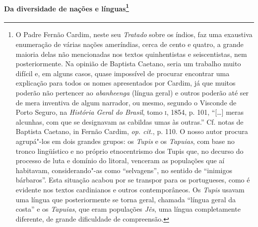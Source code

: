 \paragraph[Da diversidade de nações e línguas]{Da diversidade de nações e línguas\protect\footnote{ O
Padre Fernão Cardim, neste seu \textit{Tratado} sobre os índios, faz
uma exaustiva enumeração de várias nações ameríndias, cerca de cento e
quatro, a grande maioria delas não mencionadas nos textos quinhentistas
e seiscentistas, nem posteriormente. Na opinião de Baptista Caetano,
seria um trabalho muito difícil e, em alguns casos, quase impossível de
procurar encontrar uma explicação para todos os nomes apresentados por
Cardim, já que muitos poderão não pertencer ao \textit{abanheenga}
(língua geral) e outros poderão até ser de mera inventiva de algum
narrador, ou mesmo, segundo o Visconde de Porto Seguro, na
\textit{História Geral do Brasil}, tomo \textsc{i}, 1854, p. 101, ``[\ldots{}] meras
alcunhas, com que se designavam as cabildas umas às outras.'' Cf.
notas de Baptista Caetano, in Fernão Cardim, \textit{op. cit.}, p. 110.
O nosso autor procura agrupá"-los em dois grandes grupos: os
\textit{Tupis} e os \textit{Tapuias}, com base no tronco lingüístico e no
próprio etnocentrismo dos Tupis que, no decurso do processo de luta e
domínio do litoral, venceram as populações que aí habitavam,
considerando"-as como ``selvagens'', no sentido de ``inimigos bárbaros''. 
Esta situação acabou por se transpor para os portugueses, como é
evidente nos textos cardinianos e outros contemporâneos. Os
\textit{Tupis} usavam uma língua que posteriormente se torna geral,
chamada ``língua geral da costa'' e os \textit{Tapuias}, que eram
populações \textit{Jês}, uma língua completamente diferente, de grande
dificuldade de compreensão.}}

